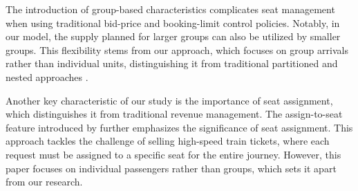 
The introduction of group-based characteristics complicates seat management when using traditional bid-price and booking-limit control policies. Notably, in our model, the supply planned for larger groups can also be utilized by smaller groups. This flexibility stems from our approach, which focuses on group arrivals rather than individual units, distinguishing it from traditional partitioned and nested approaches \parencite{curry1990optimal, van2008simulation}.




Another key characteristic of our study is the importance of seat assignment, which distinguishes it from traditional revenue management. The assign-to-seat feature introduced by \textcite{zhu2023assign} further emphasizes the significance of seat assignment. This approach tackles the challenge of selling high-speed train tickets, where each request must be assigned to a specific seat for the entire journey. However, this paper focuses on individual passengers rather than groups, which sets it apart from our research.








